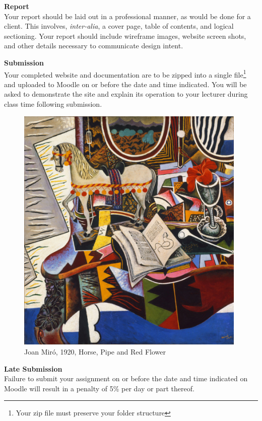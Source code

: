 \textbf{Report}\\
Your report should be laid out in a professional manner, as would be done for a client.  This involves, \emph{inter-alia}, a cover page, table of contents, and logical sectioning.  Your report should include wireframe images, website screen shots, and other details necessary to communicate design intent.
\vspace{1cm}

\textbf{Submission}\\
Your completed website and documentation are to be zipped into a single file\footnote{Your zip file must preserve your folder structure} and uploaded to Moodle on or before the date and time indicated.  You will be asked to demonstrate the site and explain its operation to your lecturer during class time following submission.




\vspace{1cm}
\begin{figure}[h!t]
	\centering
	\includegraphics[width = 11cm]{img/miro-2.jpg}
	\caption{Joan Mir\'{o}, 1920, Horse, Pipe and Red Flower}
	\label{fig:reverso}
\end{figure}



\textbf{Late Submission}\\
Failure to submit your assignment on or before the date and time indicated on Moodle will result in a penalty of 5\% per day or part thereof.

